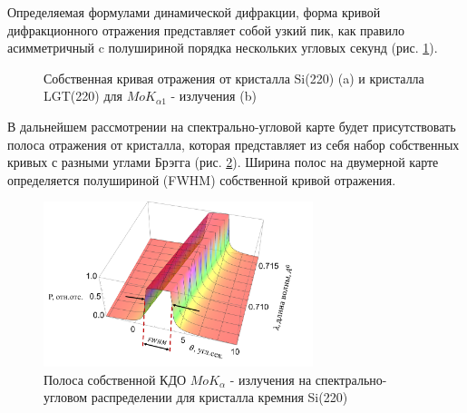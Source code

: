 \label{sec:rocking_curve_section}

Определяемая формулами динамической дифракции, форма кривой дифракционного отражения
представляет собой узкий пик, как правило асимметричный c полушириной порядка нескольких угловых секунд
(рис. \ref{ris:darwin_methody}).


\begin{figure}[H]
  \centering
  \hfill
  \caption{Собственная кривая отражения от кристалла Si(220) (a) и
  кристалла LGT(220) для $MoK_{\alpha 1}$ - излучения (b)}
  \label{ris:darwin_methody}
\end{figure}

В дальнейшем рассмотрении на спектрально-угловой карте будет присутствовать
полоса отражения от кристалла, которая представляет из себя набор собственных кривых с
разными углами Брэгга (рис. \ref{ris:darwin_lambda}).
Ширина полос на двумерной карте определяется полушириной (FWHM)
собственной кривой отражения.

\begin{figure}[H]
\centering
\includegraphics[width=0.7\textwidth]{images/darwin_lambda.png}
\caption{Полоса собственной КДО $MoK_{\alpha}$ - излучения
на спектрально-угловом распределении для кристалла
кремния  Si(220)  }
\label{ris:darwin_lambda}
\end{figure}

